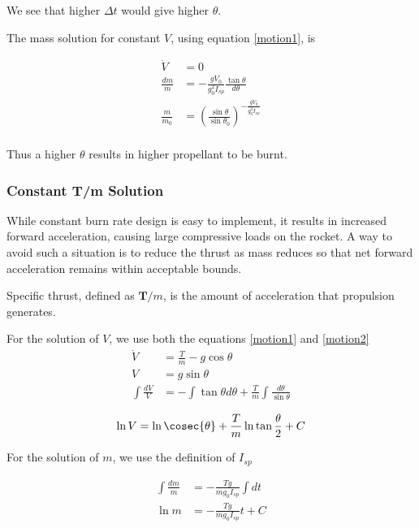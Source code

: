 \documentclass{article}
\theoremstyle{definition}
\begin{document}
We see that higher $\Delta t$ would give higher $\theta$.

The mass solution for constant $V$, using equation \ref{motion1}, is

\begin{equation}
\begin{split}
    \Dot{V} & = 0 \\
    \frac{dm}{m} & = -\frac{g V_0}{g_0^2 I_{sp}} \frac{\tan{\theta}}{d\theta} \\
    \frac{m}{m_0} & = \left(\frac{\sin{\theta}}{\sin{\theta_0}}
\right)^{-\frac{g V_0}{g_0^2 I_{sp}}}\\
\end{split}
\end{equation}

Thus a higher $\theta$ results in higher propellant to be burnt.

\subsubsection{Constant T/m Solution}

While constant burn rate design is easy to implement, it results in increased forward acceleration, causing large compressive loads on the rocket.
A way to avoid such a situation is to reduce the thrust as mass reduces so that net forward acceleration remains within acceptable bounds.

Specific thrust, defined as $\boldsymbol{T}/m$, is the amount of acceleration that propulsion generates.

For the solution of $V$, we use both the equations \ref{motion1} and \ref{motion2}
\begin{equation}
\begin{split}
    \Dot{V} & = \frac{T}{m} - g\cos{\theta}\\
    V & = g\sin{\theta} \\
    \int{\frac{dV}{V}} & =  - \int{\tan{\theta} d\theta} + \frac{T}{m} \int{\frac{d\theta}{\sin{\theta}}}
\end{split}
\end{equation}

\begin{equation}
    \ln{V} = \ln{\cosec{\theta}} + \frac{T}{m} \ln{\tan{\frac{\theta}{2}}} + C
\end{equation}

For the solution of $m$, we use the definition of $I_{sp}$ 

\begin{equation}
\begin{split}
    \int{\frac{dm}{m}} & = - \frac{T g}{m g_0 I_{sp}} \int{dt}\\
    \ln{m} & = - \frac{T g}{m g_0 I_{sp}} t + C 
\end{split}
\end{equation}
\end{document}
